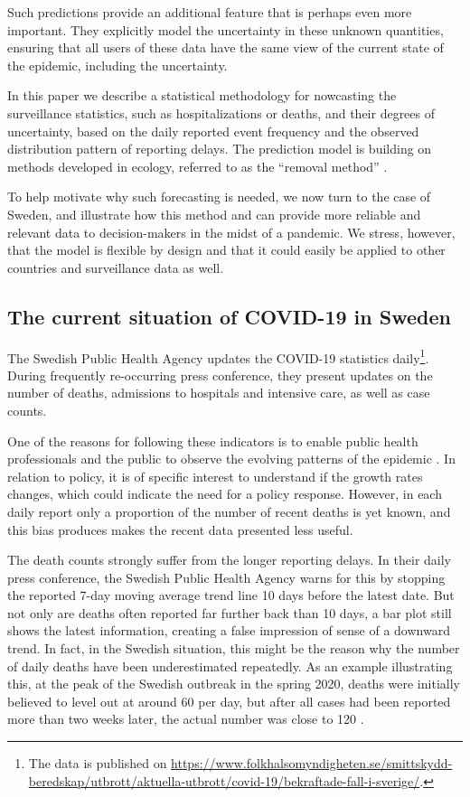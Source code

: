 \documentclass[a4paper,11pth]{article}
\begin{document}
Such predictions provide an additional feature that is perhaps even more important. They explicitly model the uncertainty in these unknown quantities, ensuring that all users of these data have the same view of the current state of the epidemic, including the uncertainty.

In this paper we describe a statistical methodology for nowcasting the surveillance statistics, such as hospitalizations or deaths, and their degrees of uncertainty, based on the daily reported event frequency and the observed distribution pattern of reporting delays. The prediction model is building on methods developed in ecology, referred to as the ``removal method'' \citep{Pollock1991_review_papers}.

To help motivate why such forecasting is needed, we now turn to the case of Sweden, and illustrate how this method and can provide more reliable and relevant data to decision-makers in the midst of a pandemic. We stress, however, that the model is flexible by design and that it could easily be applied to other countries and surveillance data as well.

\subsection{The current situation of COVID-19 in Sweden}
The Swedish Public Health Agency updates the COVID-19 statistics daily\footnote{The data is published on \url{https://www.folkhalsomyndigheten.se/smittskydd-beredskap/utbrott/aktuella-utbrott/covid-19/bekraftade-fall-i-sverige/}.}. During frequently re-occurring press conference, they present updates on the number of deaths, admissions to hospitals and intensive care, as well as case counts.

One of the reasons for following these indicators is to enable public health professionals and the public to observe the evolving patterns of the epidemic \citep{Anderson2020_how_will}. In relation to policy, it is of specific interest to understand if the growth rates changes, which could indicate the need for a policy response. However, in each daily report only a proportion of the number of recent deaths is yet known, and this bias produces makes the recent data presented less useful.

The death counts strongly suffer from the longer reporting delays. In their daily press conference, the Swedish Public Health Agency warns for this by stopping the reported 7-day moving average trend line 10 days before the latest date. But not only are deaths often reported far further back than 10 days, a bar plot still shows the latest information, creating a false impression of sense of a downward trend. In fact, in the Swedish situation, this might be the reason why the number of daily deaths have been underestimated repeatedly. As an example illustrating this, at the peak of the Swedish outbreak in the spring 2020, deaths were initially believed to level out at around 60 per day, but after all cases had been reported more than two weeks later, the actual number was close to 120 \citep{Ohman2020_antalet_virusdoda}.
\end{document}
